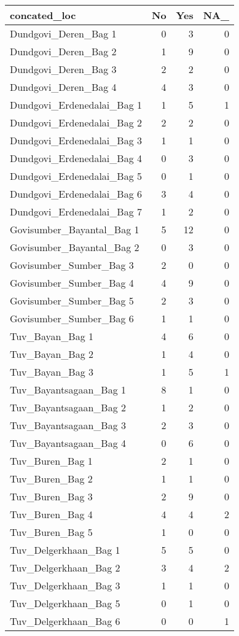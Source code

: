 \documentclass[
]{article}
\begin{document}
\begin{longtable}[]{@{}lrrr@{}}
\toprule\noalign{}
concated\_loc & No & Yes & NA\_ \\
\midrule\noalign{}
\endhead
\bottomrule\noalign{}
\endlastfoot
Dundgovi\_Deren\_Bag 1 & 0 & 3 & 0 \\
Dundgovi\_Deren\_Bag 2 & 1 & 9 & 0 \\
Dundgovi\_Deren\_Bag 3 & 2 & 2 & 0 \\
Dundgovi\_Deren\_Bag 4 & 4 & 3 & 0 \\
Dundgovi\_Erdenedalai\_Bag 1 & 1 & 5 & 1 \\
Dundgovi\_Erdenedalai\_Bag 2 & 2 & 2 & 0 \\
Dundgovi\_Erdenedalai\_Bag 3 & 1 & 1 & 0 \\
Dundgovi\_Erdenedalai\_Bag 4 & 0 & 3 & 0 \\
Dundgovi\_Erdenedalai\_Bag 5 & 0 & 1 & 0 \\
Dundgovi\_Erdenedalai\_Bag 6 & 3 & 4 & 0 \\
Dundgovi\_Erdenedalai\_Bag 7 & 1 & 2 & 0 \\
Govisumber\_Bayantal\_Bag 1 & 5 & 12 & 0 \\
Govisumber\_Bayantal\_Bag 2 & 0 & 3 & 0 \\
Govisumber\_Sumber\_Bag 3 & 2 & 0 & 0 \\
Govisumber\_Sumber\_Bag 4 & 4 & 9 & 0 \\
Govisumber\_Sumber\_Bag 5 & 2 & 3 & 0 \\
Govisumber\_Sumber\_Bag 6 & 1 & 1 & 0 \\
Tuv\_Bayan\_Bag 1 & 4 & 6 & 0 \\
Tuv\_Bayan\_Bag 2 & 1 & 4 & 0 \\
Tuv\_Bayan\_Bag 3 & 1 & 5 & 1 \\
Tuv\_Bayantsagaan\_Bag 1 & 8 & 1 & 0 \\
Tuv\_Bayantsagaan\_Bag 2 & 1 & 2 & 0 \\
Tuv\_Bayantsagaan\_Bag 3 & 2 & 3 & 0 \\
Tuv\_Bayantsagaan\_Bag 4 & 0 & 6 & 0 \\
Tuv\_Buren\_Bag 1 & 2 & 1 & 0 \\
Tuv\_Buren\_Bag 2 & 1 & 1 & 0 \\
Tuv\_Buren\_Bag 3 & 2 & 9 & 0 \\
Tuv\_Buren\_Bag 4 & 4 & 4 & 2 \\
Tuv\_Buren\_Bag 5 & 1 & 0 & 0 \\
Tuv\_Delgerkhaan\_Bag 1 & 5 & 5 & 0 \\
Tuv\_Delgerkhaan\_Bag 2 & 3 & 4 & 2 \\
Tuv\_Delgerkhaan\_Bag 3 & 1 & 1 & 0 \\
Tuv\_Delgerkhaan\_Bag 5 & 0 & 1 & 0 \\
Tuv\_Delgerkhaan\_Bag 6 & 0 & 0 & 1 \\
\end{longtable}
\end{document}
